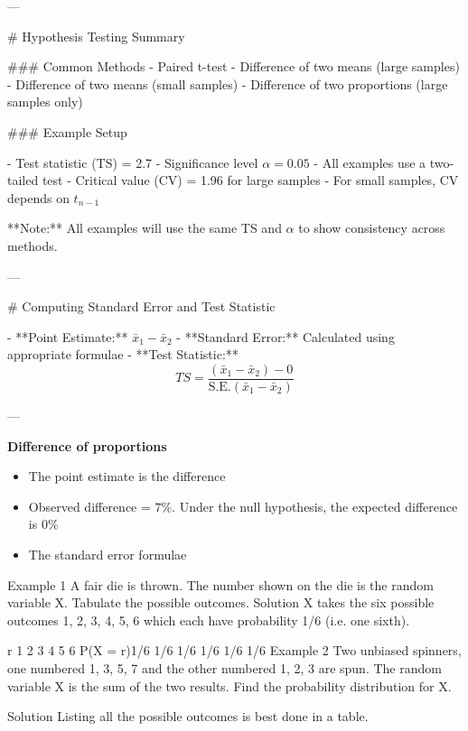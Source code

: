 ---

# Hypothesis Testing Summary

### Common Methods
- Paired t-test
- Difference of two means (large samples)
- Difference of two means (small samples)
- Difference of two proportions (large samples only)

### Example Setup

- Test statistic (TS) = 2.7  
- Significance level \( \alpha = 0.05 \)  
- All examples use a two-tailed test  
- Critical value (CV) = 1.96 for large samples  
- For small samples, CV depends on \( t_{n-1} \)

**Note:** All examples will use the same TS and \( \alpha \) to show consistency across methods.

---

# Computing Standard Error and Test Statistic

- **Point Estimate:** \( \bar{x}_1 - \bar{x}_2 \)
- **Standard Error:** Calculated using appropriate formulae
- **Test Statistic:**  
  \[
  TS = \frac{(\bar{x}_1 - \bar{x}_2) - 0}{\mbox{S.E.}(\bar{x}_1 - \bar{x}_2)}
  \]

---


\textbf{Difference of proportions}

\begin{itemize}
\item The point estimate is the difference 
\item Observed difference  = $7\%$. Under the null hypothesis, the expected difference is $0\%$
\item The standard error formulae
\end{itemize}





Example 1
A fair die is thrown. The number shown on the die is the random variable X. Tabulate the possible outcomes.
Solution
X takes the six possible outcomes 1, 2, 3, 4, 5, 6 which each have probability 1/6 (i.e. one sixth).

r 1 2 3 4 5 6
P(X = r)1/6 1/6 1/6 1/6 1/6 1/6
Example 2
Two unbiased spinners, one numbered 1, 3, 5, 7 and the other numbered 1, 2, 3 are spun. The random variable X is the sum of the two results.
Find the probability distribution for X.



Solution
Listing all the possible outcomes is best done in a table.




